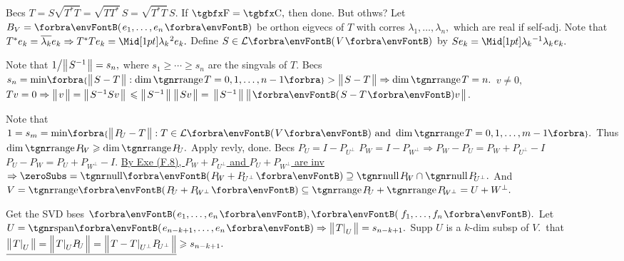 Becs $T=S\sqrt{T^*T}=\sqrt{TT^*}\,S=\sqrt{T^*T}\,S.$ \;If $\Fbb=\Cbb,$ then done. But othws\:?\parSol{}
Let $B_V=\Par{e_1,\dots,e_n}$ be orthon eigvecs of $T$ with corres $\lambda_1,\dots,\lambda_n,$ which are real if self-adj.\parSol{}
Note that $T^*e_k=\overline{\lambda_k}e_k\Rightarrow T^*Te_k=\aMidsq{\lambda_k}e_k.$ \;Define $S\in\Lm{V}$ by $Se_k=\aMid{\lambda_k}{^{-1}}\lambda_k\:\!e_k.$\PfEnd
\SepLine

Note that $1\big/\big\Vert\hspace{1pt}{}S^{-1}{}\hspace{1pt}\big\Vert=s_n,$ where $s_1\geqslant\cdots\geqslant s_n$ are the singvals of $T.$\parSol{}
Becs $s_n=\min\!\Bra{\Dvert{S-T}:\dim\range T=0,1,\dots,n-1}>\Dvert{S-T}\Rightarrow\dim\range T=n.$\PfEnd\vspace{2pt}\parSol{}
\Or $v\neq0,{}$\uline{$Tv=0\Rightarrow\big\Vert\hspace{1pt}{}v{}\hspace{1pt}\big\Vert=\big\Vert\hspace{1pt}{}S^{-1}Sv{}\hspace{1pt}\big\Vert$}${}\leqslant\big\Vert\hspace{1pt}{}S^{-1}{}\hspace{1pt}\big\Vert\:\big\Vert\hspace{1pt}{}Sv{}\hspace{1pt}\big\Vert={}$\uline{$\Dvert{S^{-1}}\:\Dvert{\Par{S-T}v}$}.\PfEnd
\SepLine

Note that $1=s_m=\min\!\Bra{\Dvert{P_{\!U}-T}:T\in\Lm{V}\text{ and }\dim\range T=0,1,\dots,m-1}.$\parSol{}
Thus $\dim\range P_{\!W}\geqslant\dim\range P_{\!U}.$ \;Apply revly, done.\PfEnd\vspace{2pt}\parSol{}
\Or Becs $P_{\!U}=I-P_{\!U^\perp}$ \OR $P_{\!W}=I-P_{\!W^\perp}\Rightarrow P_{\!W}-P_{\!U}=P_{\!W}+P_{\!U^\perp}-I$\, \OR \,$P_{\!U}-P_{\!W}=P_{\!U}+P_{\!W^\perp}-I.$\parSol{}
\uline{By Exe (F.8), $P_{\!W}+P_{\!U^\perp}$ and $P_{\!U}+P_{\!W^\perp}$ are inv} $\Rightarrow\zeroSubs=\Null\Par{P_{\!W}+P_{\!U^\perp}}\supseteq\null P_{\!W}\cap\null P_{\!U^\perp}.$\parSol{}
And $V=\Range\Par{P_{\!U}+P_{\!W^\perp}}\subseteq\range P_{\!U}+\range P_{\!W^\perp}=U+W^\perp.$\PfEnd
\SepLine

Get the SVD bses $\Par{e_1,\dots,e_n},\Par{\,f_1,\dots,f_n}.$ Let $U=\Span{e_{n-k+1},\dots,e_n}\Rightarrow\Dvert{T\mmid_U}=s_{n-k+1}.$\vspace{1pt}\parSol{}
Supp $U$ is a $k$\hspace{1pt}-\hspace{1pt}dim subsp of $V.$ \,\NOTICE that $\uline{\Dvert{T\mmid_U}=\BigDvert{T\mmid_UP_{\!U}}=\BigDvert{T-T\mmid_{U^\perp}P_{\!U^\perp}}}\geqslant s_{n-k+1}.$\PfEnd
\SepLine

